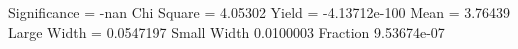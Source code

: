 Significance = -nan
Chi Square = 4.05302
Yield = -4.13712e-100
Mean = 3.76439
Large Width = 0.0547197
Small Width 0.0100003
Fraction 9.53674e-07
